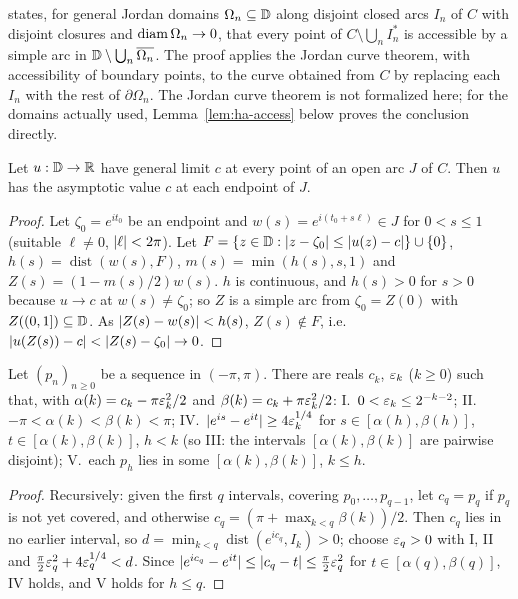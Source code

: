 \begin{remark}
\cite[Lemma]{TAMSa} states, for general Jordan domains $\Omega_n\subseteq\mathbb{D}$ along disjoint closed arcs $I_n$ of $C$ with disjoint closures and
$\operatorname{diam}\Omega_n\to0$, that every point of $C\setminus\bigcup_nI_n^*$ is accessible by a simple arc in $\mathbb{D}\setminus\bigcup_n\overline{\Omega_n}$. The
proof applies the Jordan curve theorem, with accessibility of boundary points, to the curve obtained from $C$ by replacing each $I_n$ with
the rest of $\partial\Omega_n$. The Jordan curve theorem is not formalized here; for the domains actually used,
Lemma~\ref{lem:ha-access} below proves the conclusion directly.
\end{remark}

\begin{lemma}\label{lem:general-limit-endpoints}
Let $u:\mathbb{D}\to\mathbb{R}$ have general limit $c$ at every point of an open arc $J$ of $C$. Then $u$ has the asymptotic value $c$ at each endpoint
of $J$.
\end{lemma}
\begin{proof}
Let $\zeta_0=e^{it_0}$ be an endpoint and $w(s)=e^{i(t_0+s\ell)}\in J$ for $0<s\le1$ (suitable $\ell\ne0$, $\lvert \ell\rvert<2\pi$). Let
$F=\{z\in\mathbb{D}:\lvert z-\zeta_0\rvert\le\lvert u(z)-c\rvert\}\cup\{0\}$, $h(s)=\operatorname{dist}(w(s),F)$, $m(s)=\min(h(s),s,1)$ and
$Z(s)=(1-m(s)/2)w(s)$. $h$ is continuous, and $h(s)>0$ for $s>0$ because $u\to c$ at $w(s)\ne\zeta_0$; so $Z$ is a simple arc from
$\zeta_0=Z(0)$ with $Z((0,1])\subseteq\mathbb{D}$. As $\lvert Z(s)-w(s)\rvert<h(s)$, $Z(s)\notin F$, i.e.\ $\lvert u(Z(s))-c\rvert<\lvert Z(s)-\zeta_0\rvert\to0$.
\end{proof}

\begin{lemma}\label{lem:ha-sequences}
Let $(p_n)_{n\ge0}$ be a sequence in $(-\pi,\pi)$. There are reals $c_k$, $\varepsilon_k$ ($k\ge0$) such that, with
$\alpha(k)=c_k-\pi\varepsilon_k^2/2$ and $\beta(k)=c_k+\pi\varepsilon_k^2/2$:
I.~$0<\varepsilon_k\le2^{-k-2}$; II.~$-\pi<\alpha(k)<\beta(k)<\pi$;
IV.~$\lvert e^{is}-e^{it}\rvert\ge4\varepsilon_k^{1/4}$ for $s\in[\alpha(h),\beta(h)]$, $t\in[\alpha(k),\beta(k)]$, $h<k$ (so III: the intervals
$[\alpha(k),\beta(k)]$ are pairwise disjoint); V.~each $p_h$ lies in some $[\alpha(k),\beta(k)]$, $k\le h$.
\end{lemma}
\begin{proof}
Recursively: given the first $q$ intervals, covering $p_0,\dots,p_{q-1}$, let $c_q=p_q$ if $p_q$ is not yet covered, and otherwise
$c_q=(\pi+\max_{k<q}\beta(k))/2$. Then $c_q$ lies in no earlier interval, so $d=\min_{k<q}\operatorname{dist}(e^{ic_q},I_k)>0$; choose
$\varepsilon_q>0$ with I, II and $\frac\pi2\varepsilon_q^2+4\varepsilon_q^{1/4}<d$. Since $\lvert e^{ic_q}-e^{it}\rvert\le\lvert c_q-t\rvert\le\frac\pi2\varepsilon_q^2$ for
$t\in[\alpha(q),\beta(q)]$, IV holds, and V holds for $h\le q$.
\end{proof}

